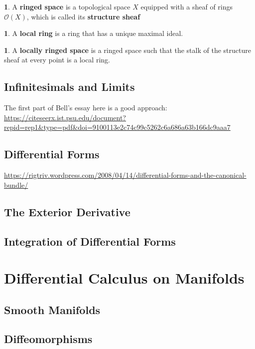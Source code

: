 \documentclass[oneside,english]{amsbook}
\numberwithin{section}{chapter}
\theoremstyle{plain}
\theoremstyle{definition}
\newtheorem{defn}[thm]{\protect\definitionname}
\providecommand{\definitionname}{Definition}
\begin{document}
			\begin{defn} 
				A \textbf{ringed space} is a topological space $X$ equipped with a sheaf of rings $\mathscr{O}(X)$, which is called its \textbf{structure sheaf}
			\end{defn}
			
			\begin{defn} 
				A \textbf{local ring} is a ring that has a unique maximal ideal.
			\end{defn}
			
			\begin{defn} 
				A \textbf{locally ringed space} is a ringed space such that the stalk of the structure sheaf at every point is a local ring.
			\end{defn}

		\section{Infinitesimals and Limits}
		
		The first part of Bell's essay here is a good approach: \url{https://citeseerx.ist.psu.edu/document?repid=rep1&type=pdf&doi=9100113e2c74c99c5262c6a686a63b166dc9aaa7}
		
		\section{Differential Forms}
		
		\url{https://rigtriv.wordpress.com/2008/04/14/differential-forms-and-the-canonical-bundle/}
	
		\section{The Exterior Derivative}
	
		\section{Integration of Differential Forms}


	\chapter{Differential Calculus on Manifolds}
	
		\section{Smooth Manifolds}

		\section{Diffeomorphisms}
\end{document}

